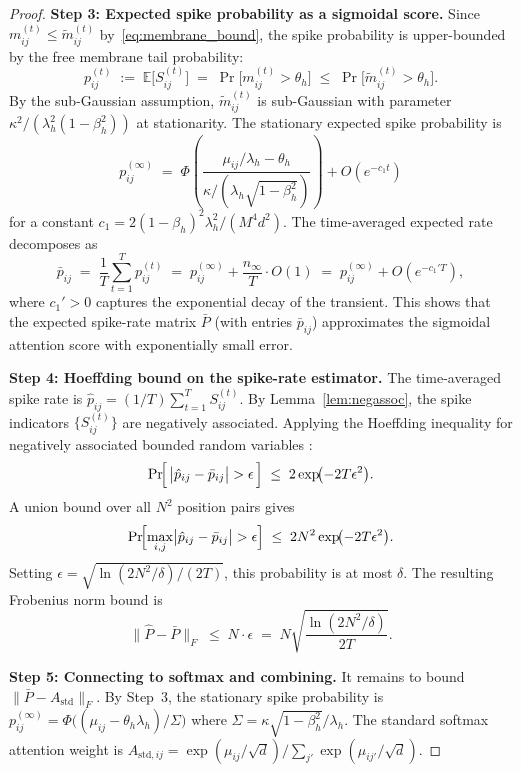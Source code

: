 \documentclass{article}
\begin{document}
\begin{proof}
\medskip
\noindent\textbf{Step 3: Expected spike probability as a sigmoidal score.}
Since $m_{ij}^{(t)} \le \widetilde{m}_{ij}^{(t)}$ by~\eqref{eq:membrane_bound},
the spike probability is upper-bounded by the free membrane tail probability:
\[
  p_{ij}^{(t)} \;:=\; \mathbb{E}\bigl[S_{ij}^{(t)}\bigr]
  \;=\; \Pr\!\bigl[m_{ij}^{(t)} > \theta_h\bigr]
  \;\le\; \Pr\!\bigl[\widetilde{m}_{ij}^{(t)} > \theta_h\bigr].
\]
By the sub-Gaussian assumption, $\widetilde{m}_{ij}^{(t)}$ is sub-Gaussian
with parameter $\kappa^2 / (\lambda_h^2 (1-\beta_h^2))$ at stationarity.
The stationary expected spike probability is
\[
  p_{ij}^{(\infty)} \;=\; \Phi\!\left(
    \frac{\mu_{ij}/\lambda_h - \theta_h}
         {\kappa / (\lambda_h\sqrt{1-\beta_h^2})}
  \right) + O(e^{-c_1 t})
\]
for a constant $c_1 = 2(1-\beta_h)^2 \lambda_h^2 / (M^4 d^2)$.
The time-averaged expected rate decomposes as
\[
  \bar{p}_{ij}
  \;=\; \frac{1}{T}\sum_{t=1}^{T} p_{ij}^{(t)}
  \;=\; p_{ij}^{(\infty)} + \frac{n_\infty}{T} \cdot O(1)
  \;=\; p_{ij}^{(\infty)} + O(e^{-c_1' T}),
\]
where $c_1' > 0$ captures the exponential decay of the transient.
This shows that the expected spike-rate matrix $\bar{P}$ (with entries
$\bar{p}_{ij}$) approximates the sigmoidal attention score with
exponentially small error.

\medskip
\noindent\textbf{Step 4: Hoeffding bound on the spike-rate estimator.}
The time-averaged spike rate is
$\hat{p}_{ij} = (1/T)\sum_{t=1}^{T} S_{ij}^{(t)}$.
By Lemma~\ref{lem:negassoc}, the spike indicators $\{S_{ij}^{(t)}\}$
are negatively associated.  Applying the Hoeffding inequality for
negatively associated bounded random variables
\cite{joag1983negative}:
\[
  \Pr\!\Bigl[\,\bigl|\hat{p}_{ij} - \bar{p}_{ij}\bigr| > \epsilon\,\Bigr]
  \;\le\; 2\exp\!\bigl(-2T\epsilon^2\bigr).
\]
A union bound over all $N^2$ position pairs gives
\[
  \Pr\!\Bigl[\max_{i,j}\bigl|\hat{p}_{ij} - \bar{p}_{ij}\bigr| > \epsilon\Bigr]
  \;\le\; 2N^2\exp\!\bigl(-2T\epsilon^2\bigr).
\]
Setting $\epsilon = \sqrt{\ln(2N^2/\delta) / (2T)}$, this probability is
at most $\delta$.
The resulting Frobenius norm bound is
\begin{equation}\label{eq:hoeffding_frob}
  \bigl\|\hat{P} - \bar{P}\bigr\|_F
  \;\le\; N \cdot \epsilon
  \;=\; N\sqrt{\frac{\ln(2N^2/\delta)}{2T}}.
\end{equation}

\medskip
\noindent\textbf{Step 5: Connecting to softmax and combining.}
It remains to bound $\|\bar{P} - A_{\mathrm{std}}\|_F$.
By Step~3, the stationary spike probability is
$p_{ij}^{(\infty)} = \Phi\bigl((\mu_{ij} - \theta_h \lambda_h) / \Sigma\bigr)$
where $\Sigma = \kappa\sqrt{1-\beta_h^2} / \lambda_h$.
The standard softmax attention weight is
$A_{\mathrm{std},ij} = \exp(\mu_{ij}/\sqrt{d}) / \sum_{j'} \exp(\mu_{ij'}/\sqrt{d})$.


\end{proof}
\end{document}
